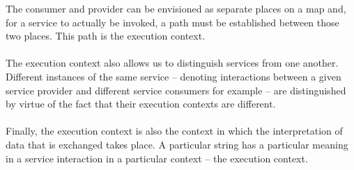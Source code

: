 \documentclass[10pt,a4paper]{article}
\begin{document}
The consumer and provider can be envisioned as separate places on a map and, for a service to actually be invoked, a path must be established between those two places. This path is the execution context. \\ \\
The execution context also allows us to distinguish services from one another. Different instances of the same service – denoting interactions between a given service provider and different service consumers for example – are distinguished by virtue of the fact that their execution contexts are different. \\ \\
Finally, the execution context is also the context in which the interpretation of data that is exchanged takes place. A particular string has a particular meaning in a service interaction in a particular context – the execution context.
\pagebreak
\end{document}
